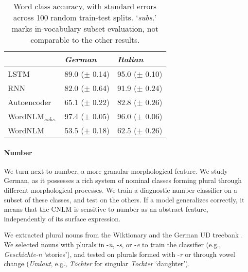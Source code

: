 \begin{table}[t]
\footnotesize
    \begin{center}
      \begin{tabular}{l|l|l}
        &\emph{German}&\emph{Italian}\\
        \hline
        LSTM & 89.0 ($\pm$ 0.14) & 95.0 ($\pm$ 0.10) \\
        RNN & 82.0 ($\pm$ 0.64) & 91.9 ($\pm$ 0.24) \\
        Autoencoder & 65.1 ($\pm$ 0.22) & 82.8 ($\pm$ 0.26) \\
	      WordNLM$_{\textit{subs.}}$ & 97.4 ($\pm$ 0.05) & 96.0 ($\pm$ 0.06) \\
	      WordNLM & 53.5 ($\pm$ 0.18)  & 62.5 ($\pm$ 0.26) \\
      \end{tabular}
    \end{center}
	\caption{\label{tab:pos-results} Word class accuracy, with standard errors across 100 random train-test splits. `\emph{subs.}' marks in-vocabulary subset evaluation, not comparable to the other results.} %
\end{table}






\paragraph{Number}
We turn next to number, a more granular morphological feature. We
study German, as it possesses a rich system of nominal classes forming
plural through different morphological processes. We train a diagnostic number
classifier on a subset of these classes, and test on the others. If a
model generalizes correctly, it means that the CNLM is sensitive to number
as an abstract feature, independently of its surface expression.

We extracted plural nouns from the Wiktionary and the German UD
treebank \cite{mcdonald2013universal,brants2002tiger}.  We selected %
nouns with plurals in -\emph{n}, -\emph{s}, or -\emph{e} to train the classifier (e.g., \emph{Geschichte-n} `stories'), and tested on plurals formed with
-\emph{r} or through vowel change (\emph{Umlaut}, e.g., \emph{T{\"o}chter} for singular \emph{Tochter} `daughter').

